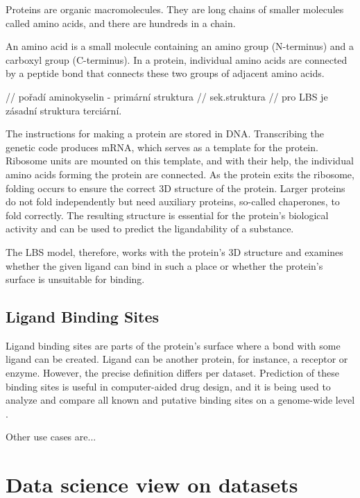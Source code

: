 Proteins are organic macromolecules. They are long chains of smaller molecules called amino acids, and there are hundreds in a chain.

An amino acid is a small molecule containing an amino group (N-terminus) and a carboxyl group (C-terminus). In a protein, individual amino acids are connected by a peptide bond that connects these two groups of adjacent amino acids.

// pořadí aminokyselin - primární struktura
// sek.struktura
// pro LBS je zásadní struktura terciární.

The instructions for making a protein are stored in DNA. Transcribing the genetic code produces mRNA, which serves as a template for the protein. Ribosome units are mounted on this template, and with their help, the individual amino acids forming the protein are connected. As the protein exits the ribosome, folding occurs to ensure the correct 3D structure of the protein. Larger proteins do not fold independently but need auxiliary proteins, so-called chaperones, to fold correctly. The resulting structure is essential for the protein's biological activity and can be used to predict the ligandability of a substance.

The LBS model, therefore, works with the protein's 3D structure and examines whether the given ligand can bind in such a place or whether the protein's surface is unsuitable for binding.



\subsection{Ligand Binding Sites}

Ligand binding sites are parts of the protein's surface where a bond with some ligand can be created. Ligand can be another protein, for instance, a receptor or enzyme. However, the precise definition differs per dataset. Prediction of these binding sites is useful in computer-aided drug design, and it is being used to analyze and compare all known and putative binding sites on a genome-wide level \cite{P2RANK}.

Other use cases are...



\section{Data science view on datasets}

